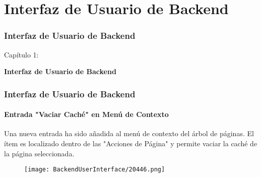 %

\section{Interfaz de Usuario de Backend}
\begin{frame}[fragile]
	\frametitle{Interfaz de Usuario de Backend}

	\begin{center}\huge{Capítulo 1:}\end{center}
	\begin{center}\huge{\color{typo3darkgrey}\textbf{Interfaz de Usuario de Backend}}\end{center}

\end{frame}

\begin{frame}[fragile]
	\frametitle{Interfaz de Usuario de Backend}
	\framesubtitle{Entrada "Vaciar Caché" en Menú de Contexto}

	Una nueva entrada ha sido añadida al menú de contexto del árbol de páginas. El ítem es localizado dentro de las "Acciones de Página"
	y permite vaciar la caché de la página seleccionada.

	\begin{figure}
		\texttt{[image: BackendUserInterface/20446.png]}
	\end{figure}

\end{frame}

